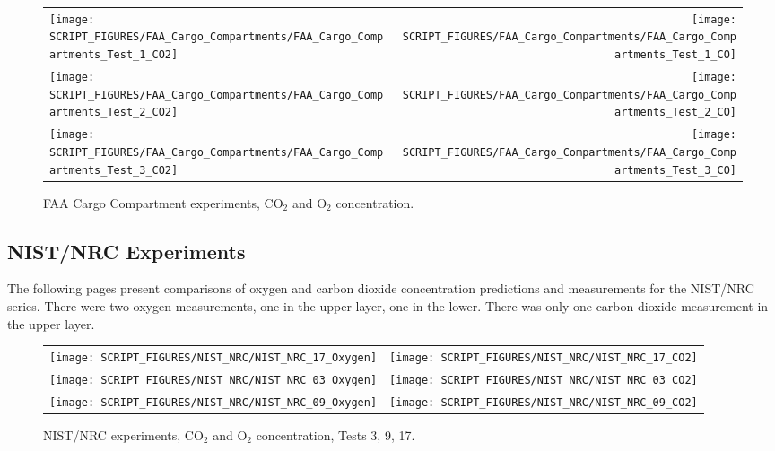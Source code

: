 \begin{figure}[h]
\begin{tabular*}{\textwidth}{l@{\extracolsep{\fill}}r}
\texttt{[image: SCRIPT\_FIGURES/FAA\_Cargo\_Compartments/FAA\_Cargo\_Compartments\_Test\_1\_CO2]} &
\texttt{[image: SCRIPT\_FIGURES/FAA\_Cargo\_Compartments/FAA\_Cargo\_Compartments\_Test\_1\_CO]} \\
\texttt{[image: SCRIPT\_FIGURES/FAA\_Cargo\_Compartments/FAA\_Cargo\_Compartments\_Test\_2\_CO2]} &
\texttt{[image: SCRIPT\_FIGURES/FAA\_Cargo\_Compartments/FAA\_Cargo\_Compartments\_Test\_2\_CO]} \\
\texttt{[image: SCRIPT\_FIGURES/FAA\_Cargo\_Compartments/FAA\_Cargo\_Compartments\_Test\_3\_CO2]} &
\texttt{[image: SCRIPT\_FIGURES/FAA\_Cargo\_Compartments/FAA\_Cargo\_Compartments\_Test\_3\_CO]}
\end{tabular*}
\caption{FAA Cargo Compartment experiments, CO$_2$ and O$_2$ concentration.}
\label{FAA_Cargo_CO2_CO}
\end{figure}

\clearpage

\subsection{NIST/NRC Experiments}

The following pages present comparisons of oxygen and carbon dioxide concentration predictions and measurements for the
NIST/NRC series. There were two oxygen measurements, one in the upper layer, one in the lower.  There was only one carbon
dioxide measurement in the upper layer.

\begin{figure}[h]
\begin{tabular*}{\textwidth}{l@{\extracolsep{\fill}}r}
\texttt{[image: SCRIPT\_FIGURES/NIST\_NRC/NIST\_NRC\_17\_Oxygen]} &
\texttt{[image: SCRIPT\_FIGURES/NIST\_NRC/NIST\_NRC\_17\_CO2]} \\
\texttt{[image: SCRIPT\_FIGURES/NIST\_NRC/NIST\_NRC\_03\_Oxygen]} &
\texttt{[image: SCRIPT\_FIGURES/NIST\_NRC/NIST\_NRC\_03\_CO2]} \\
\texttt{[image: SCRIPT\_FIGURES/NIST\_NRC/NIST\_NRC\_09\_Oxygen]} &
\texttt{[image: SCRIPT\_FIGURES/NIST\_NRC/NIST\_NRC\_09\_CO2]}
\end{tabular*}
\caption{NIST/NRC experiments, CO$_2$ and O$_2$ concentration, Tests 3, 9, 17.}
\label{NIST_NRC_Gas_Open_1}
\end{figure}

